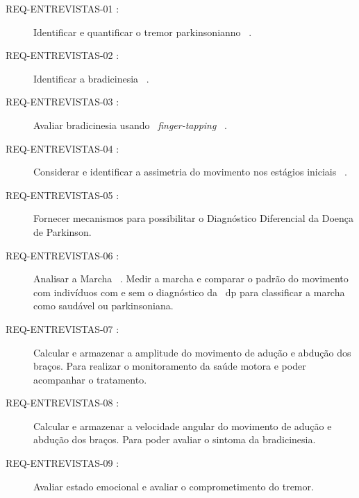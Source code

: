 \begin{description}
	\item[REQ-ENTREVISTAS-01 :] Identificar e quantificar o tremor parkinsonianno ~\cite{tolosa06,keijsers2006,lemoyne2010}.
	\item[REQ-ENTREVISTAS-02 :] Identificar a bradicinesia ~\cite{patel_monitoring_2009}. %
	\item[REQ-ENTREVISTAS-03 :] Avaliar bradicinesia usando ~\textit{finger-tapping} ~\cite{finger2012}.
	\item[REQ-ENTREVISTAS-04 :] Considerar e identificar a assimetria do movimento nos estágios iniciais ~\cite{national2006parkinson}.	%
	\item[REQ-ENTREVISTAS-05 :] Fornecer mecanismos para possibilitar o Diagnóstico Diferencial \cite{protpar010} da Doença de Parkinson. %
	\item[REQ-ENTREVISTAS-06 :] Analisar a Marcha ~\cite{gaitusingsensorsreview2012}. Medir a marcha e comparar o padrão do movimento com indivíduos com e sem o diagnóstico da ~\ac{dp} para classificar a marcha como saudável ou parkinsoniana.
	\item[REQ-ENTREVISTAS-07 :] Calcular e armazenar a amplitude do movimento de adução e abdução dos braços. Para realizar o monitoramento da saúde motora e poder acompanhar o tratamento.
	\item[REQ-ENTREVISTAS-08 :] Calcular e armazenar a velocidade angular do movimento de adução e abdução dos braços. Para poder avaliar o sintoma da bradicinesia.
	\item[REQ-ENTREVISTAS-09 :] Avaliar estado emocional e avaliar o comprometimento do tremor. 
\end{description}



